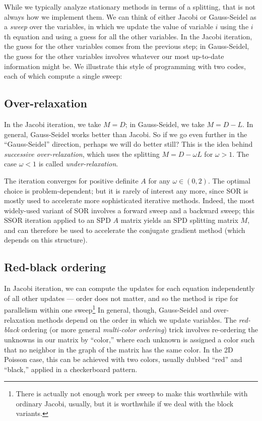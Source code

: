 \documentclass[12pt, leqno]{article} %
\begin{document}
While we typically analyze stationary methods in terms of a splitting,
that is not always how we implement them.  We can think of either Jacobi
or Gauss-Seidel as a {\em sweep} over the variables, in which we update
the value of variable $i$ using the $i$th equation and using a guess for
all the other variables.  In the Jacobi iteration, the guess for the
other variables comes from the previous step; in Gauss-Seidel, the guess
for the other variables involves whatever our most up-to-date information
might be.  We illustrate this style of programming with two codes, each
of which compute a single sweep:




\subsection{Over-relaxation}

In the Jacobi iteration, we take $M = D$; in Gauss-Seidel, we take $M = D-L$.
In general, Gauss-Seidel works better than Jacobi.  So if we go even further
in the ``Gauss-Seidel'' direction, perhaps we will do better still?  This is
the idea behind {\em successive over-relaxation}, which uses the splitting
$M = D-\omega L$ for $\omega > 1$.  The case $\omega < 1$ is called
{\em under-relaxation}.

The iteration converges for positive definite $A$ for any $\omega \in (0,2)$.
The optimal choice is problem-dependent; but it is rarely of interest any
more, since SOR is mostly used to accelerate more sophisticated iterative
methods.  Indeed, the most widely-used variant of SOR involves a
forward sweep and a backward sweep; this SSOR iteration applied to an SPD $A$
matrix yields an SPD splitting matrix $M$, and can therefore be used to
accelerate the conjugate gradient method (which depends on this structure).

\subsection{Red-black ordering}

In Jacobi iteration, we can compute the updates for each equation
independently of all other updates --- order does not matter, and so the
method is ripe for parallelism within one sweep\footnote{%
  There is actually not enough work per sweep to make this worthwhile
  with ordinary Jacobi, usually, but it is worthwhile if we deal
  with the block variants.
}
In general, though, Gauss-Seidel and over-relaxation methods depend
on the order in which we update variables.  The {\em red-black} ordering
(or more general {\em multi-color ordering}) trick involves re-ordering
the unknowns in our matrix by ``color,'' where each unknown is assigned
a color such that no neighbor in the graph of the matrix has the same
color.  In the 2D Poisson case, this can be achieved with two colors,
usually dubbed ``red'' and ``black,'' applied in a checkerboard pattern.
\end{document}
